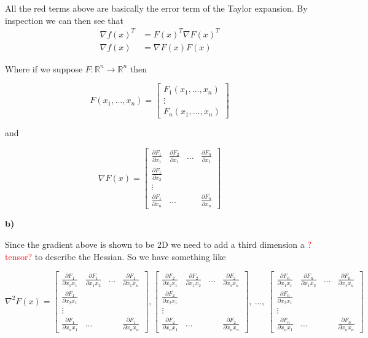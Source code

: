 All the red terms above are basically the error term of the Taylor expansion. By inspection we can then see that 
\begin{align*}
	\nabla f(x)^T &= F(x)^T\nabla F(x)^T \\
	\nabla f(x) &= \nabla F(x)F(x)
\end{align*}


Where if we suppose $F: \mathbb{R}^n \rightarrow \mathbb{R}^n$ then

\[
F(x_1, \ldots, x_n) =
\begin{bmatrix}
	F_1(x_1, \ldots, x_n) \\
	\vdots \\
	F_n(x_1, \ldots, x_n)
\end{bmatrix}
\]

and

\[
\nabla F(x) =
\begin{bmatrix}
	\frac{\partial F_1}{\partial x_1} & \frac{\partial F_2}{\partial x_1} & \ldots & \frac{\partial F_n}{\partial x_1} \\
	\frac{\partial F_1}{\partial x_2} & \\
	\vdots \\
	\frac{\partial F_1}{\partial x_n} & \ldots & & \frac{\partial F_n}{\partial x_n}
\end{bmatrix}
\]


\textbf{b)}

Since the gradient above is shown to be 2D we need to add a third dimension a \textcolor{red}{?tensor?} to describe the Hessian. So we have something like

\[
\nabla^2 F(x) =
\begin{bmatrix}
\frac{\partial F_1}{\partial x_1 x_1} & \frac{\partial F_1}{\partial x_1 x_2} & \ldots & \frac{\partial F_1}{\partial x_1 x_n} \\
\frac{\partial F_1}{\partial x_2 x_1} & \\
\vdots \\
\frac{\partial F_1}{\partial x_n x_1} & \ldots & & \frac{\partial F_1}{\partial x_n x_n}
\end{bmatrix},
\begin{bmatrix}
\frac{\partial F_2}{\partial x_1 x_1} & \frac{\partial F_2}{\partial x_1 x_2} & \ldots & \frac{\partial F_2}{\partial x_1 x_n} \\
\frac{\partial F_2}{\partial x_2 x_1} & \\
\vdots \\
\frac{\partial F_2}{\partial x_n x_1} & \ldots & & \frac{\partial F_2}{\partial x_n x_n}
\end{bmatrix},\ \ldots,\
\begin{bmatrix}
\frac{\partial F_n}{\partial x_1 x_1} & \frac{\partial F_n}{\partial x_1 x_2} & \ldots & \frac{\partial F_n}{\partial x_1 x_n} \\
\frac{\partial F_n}{\partial x_2 x_1} & \\
\vdots \\
\frac{\partial F_n}{\partial x_n x_1} & \ldots & & \frac{\partial F_n}{\partial x_n x_n}
\end{bmatrix}
\]

